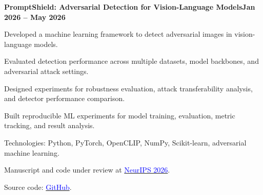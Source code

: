 \documentclass[letterpaper,10pt]{article}
\newcommand{\heading}[2]{
  \hspace{10pt}#1\hfill#2\\
}
\newcommand{\headingBf}[2]{
  \heading{\textbf{#1}}{\textbf{#2}}
}
\newenvironment{resume_list}{
  \vspace{-7pt}
  \begin{itemize}[itemsep=-2px, parsep=1pt, leftmargin=30pt]
}{
  \end{itemize}
}
\begin{document}
\headingBf{PromptShield: Adversarial Detection for Vision-Language Models}{Jan 2026 -- May 2026}
\begin{resume_list}
\item Developed a machine learning framework to detect adversarial images in vision-language models.
\item Evaluated detection performance across multiple datasets, model backbones, and adversarial attack settings.
\item Designed experiments for robustness evaluation, attack transferability analysis, and detector performance comparison.
\item Built reproducible ML experiments for model training, evaluation, metric tracking, and result analysis.
\item Technologies: Python, PyTorch, OpenCLIP, NumPy, Scikit-learn, adversarial machine learning.
\item Manuscript and code under review at \href{https://neurips.cc/}{\textcolor{blue}{NeurIPS 2026}}.
\item Source code: \href{https://github.com/arashVsh/PromptShield}{\textcolor{blue}{GitHub}}.
\end{resume_list}

\end{document}
